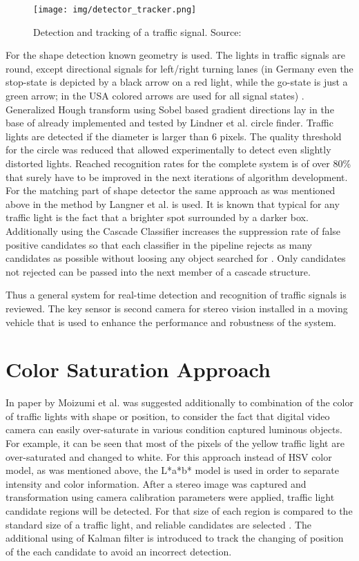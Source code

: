 \documentclass[letterpaper, 10 pt, conference]{ieeeconf} %
\begin{document}
\begin{figure}[thpb]
	\centering
	\texttt{[image: img/detector\_tracker.png]}
	\caption{Detection and tracking of a traffic signal. Source: \cite{c6}}
	\label{dettrack}
\end{figure}

For the shape detection known geometry is used. The lights in traffic signals are round, except directional signals for left/right turning lanes (in Germany even the stop-state is depicted by a black arrow on a red light, while the go-state is just a green arrow; in the USA colored arrows are used for all signal states) \cite{c6}. Generalized Hough transform using Sobel based gradient directions lay in the base of already implemented and tested by Lindner et al. circle finder. Traffic lights are detected if the diameter is larger than 6 pixels. The quality threshold for the circle was reduced that allowed experimentally to detect even slightly distorted lights. Reached recognition rates for the complete system is of over 80\% that surely have to be improved in the next iterations of algorithm development. For the matching part of shape detector the same approach as was mentioned above in the method by Langner et al. is used. It is known that typical for any traffic light is the fact that a brighter spot surrounded by a darker box. Additionally using the Cascade Classifier increases the suppression rate of false positive candidates so that each classifier in the pipeline rejects as many candidates as possible without loosing any object searched for \cite{c6}. Only candidates not rejected can be passed into the next member of a cascade structure. 

Thus a general system for real-time detection and recognition of traffic signals is reviewed. The key sensor is second camera for stereo vision installed in a moving vehicle that is used to enhance the performance and robustness of the system. 


\section{Color Saturation Approach}
In paper by Moizumi et al. \cite{c3} was suggested additionally to combination of the color of traffic lights with shape or position, to consider the fact that digital video camera can easily over-saturate in various condition captured luminous objects. For example, it can be seen that most of the pixels of the yellow traffic light are over-saturated and changed to white. For this approach instead of HSV color model, as was mentioned above, the L*a*b* model is used in order to separate intensity and color information. After a stereo image was captured and transformation using camera calibration parameters were applied, traffic light candidate regions will be detected. For that size of each region is compared to the standard size of a traffic light, and reliable candidates are selected \cite{c3}. The additional using of Kalman filter is introduced to track the changing of position of the each candidate to avoid an incorrect detection. 
\end{document}
